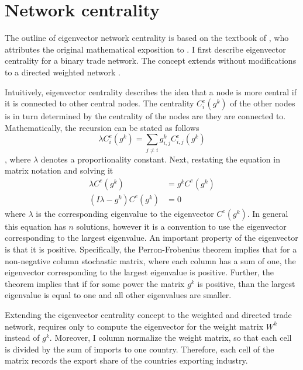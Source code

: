  \section{Network centrality}
The outline of eigenvector network centrality is based on the textbook of \textcite{jackson2010}, who attributes the original mathematical exposition to \textcite{Bonacich77}.
I first describe eigenvector centrality for a binary trade network.
The concept extends without modifications to a directed weighted network  \parencite{jackson2010}.  \par
Intuitively, eigenvector centrality describes the idea that a node is more central if it is connected to other central nodes.
The centrality $C^e_i (g^k)$ of the other nodes is in turn determined by the centrality of the nodes are they are connected to.
Mathematically, the recursion can be stated as follows
\[  \lambda C^e_i (g^k) = \sum_{j \neq i}  g^k_{i,j}C^e_{i,j}(g^k)  \]
, where $\lambda$ denotes a proportionality constant. Next,
restating the equation in matrix notation and solving it
\begin{align*}
 \lambda C^e (g^k) & =  g^k C^e (g^k) \\
( I  \lambda-g^k) C^e(g^k) & = 0
 \end{align*}
where $ \lambda$ is the corresponding eigenvalue to the eigenvector $C^e(g^k)$.
In general this equation has $n$ solutions, however it is a convention to use the eigenvector corresponding to the largest eigenvalue.
An important property of the eigenvector is that it is positive.
Specifically, the Perron-Frobenius theorem implies that for a non-negative column stochastic matrix, where each column has a sum of one, the eigenvector corresponding to the largest eigenvalue is positive.
Further, the theorem implies that if for some power the matrix $g^k$ is positive, than the largest eigenvalue is equal to one and all other eigenvalues are smaller.
 \par
Extending the eigenvector centrality concept to the weighted and directed trade network, requires only to compute the eigenvector for the weight matrix $W^k$ instead of $g^k$.
Moreover, I column normalize the weight matrix, so that each cell is divided by the sum of imports to one country.
Therefore, each cell of the matrix  records the export share of the countries exporting industry.

